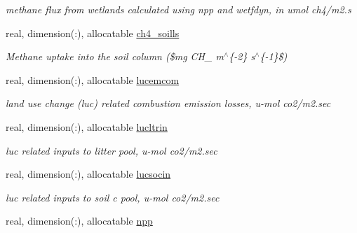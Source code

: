 \begin{DoxyCompactItemize}
\begin{DoxyCompactList}\small\item\em methane flux from wetlands calculated using npp and wetfdyn, in umol ch4/m2.\+s \end{DoxyCompactList}\item 
\hypertarget{structctem__statevars_1_1veg__gat_a5da13376de8ebf44de19c03fffc63e68}{}real, dimension(\+:), allocatable \hyperlink{structctem__statevars_1_1veg__gat_a5da13376de8ebf44de19c03fffc63e68}{ch4\+\_\+soills}\label{structctem__statevars_1_1veg__gat_a5da13376de8ebf44de19c03fffc63e68}

\begin{DoxyCompactList}\small\item\em Methane uptake into the soil column (\$mg C\+H\+\_ m$^\wedge$\{-\/2\} s$^\wedge$\{-\/1\}\$) \end{DoxyCompactList}\item 
\hypertarget{structctem__statevars_1_1veg__gat_a5e4ce2fef4b5c4653d0c8d12b77b6b00}{}real, dimension(\+:), allocatable \hyperlink{structctem__statevars_1_1veg__gat_a5e4ce2fef4b5c4653d0c8d12b77b6b00}{lucemcom}\label{structctem__statevars_1_1veg__gat_a5e4ce2fef4b5c4653d0c8d12b77b6b00}

\begin{DoxyCompactList}\small\item\em land use change (luc) related combustion emission losses, u-\/mol co2/m2.\+sec \end{DoxyCompactList}\item 
\hypertarget{structctem__statevars_1_1veg__gat_aa3d9e02c11f4d41d8199b352c45815c5}{}real, dimension(\+:), allocatable \hyperlink{structctem__statevars_1_1veg__gat_aa3d9e02c11f4d41d8199b352c45815c5}{lucltrin}\label{structctem__statevars_1_1veg__gat_aa3d9e02c11f4d41d8199b352c45815c5}

\begin{DoxyCompactList}\small\item\em luc related inputs to litter pool, u-\/mol co2/m2.\+sec \end{DoxyCompactList}\item 
\hypertarget{structctem__statevars_1_1veg__gat_a9945abd11d50ee3284a31c7f5e637515}{}real, dimension(\+:), allocatable \hyperlink{structctem__statevars_1_1veg__gat_a9945abd11d50ee3284a31c7f5e637515}{lucsocin}\label{structctem__statevars_1_1veg__gat_a9945abd11d50ee3284a31c7f5e637515}

\begin{DoxyCompactList}\small\item\em luc related inputs to soil c pool, u-\/mol co2/m2.\+sec \end{DoxyCompactList}\item 
\hypertarget{structctem__statevars_1_1veg__gat_a501f510a904f3a3e4caefc7a4887944f}{}real, dimension(\+:), allocatable \hyperlink{structctem__statevars_1_1veg__gat_a501f510a904f3a3e4caefc7a4887944f}{npp}\label{structctem__statevars_1_1veg__gat_a501f510a904f3a3e4caefc7a4887944f}


\end{DoxyCompactItemize}
